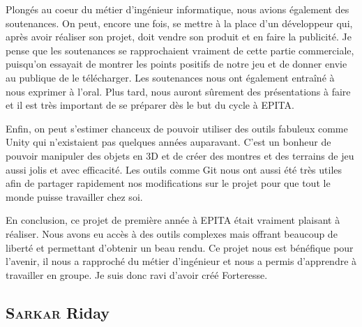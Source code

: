\documentclass[a4paper, 12pt]{article}
\begin{document}
\medbreak
\par Plongés au coeur du métier d’ingénieur informatique, nous avions également des soutenances. On peut, encore une fois, se mettre à la place d’un développeur qui, après avoir réaliser son projet, doit vendre son produit et en faire la publicité. Je pense que les soutenances se rapprochaient vraiment de cette partie commerciale, puisqu’on essayait de montrer les points positifs de notre jeu et de donner envie au publique de le télécharger. Les soutenances nous ont également entraîné à nous exprimer à l’oral. Plus tard, nous auront sûrement des présentations à faire et il est très important de se préparer dès le but du cycle à EPITA. 
\medbreak
\par Enfin, on peut s’estimer chanceux de pouvoir utiliser des outils fabuleux comme Unity qui n’existaient pas quelques années auparavant. C’est un bonheur de pouvoir manipuler des objets en 3D et de créer des montres et des terrains de jeu aussi jolis et avec efficacité. Les outils comme Git nous ont aussi été très utiles afin de partager rapidement nos modifications sur le projet pour que tout le monde puisse travailler chez soi.
\medbreak
\par En conclusion, ce projet de première année à EPITA était vraiment plaisant à réaliser. Nous avons eu accès à des outils complexes mais offrant beaucoup de liberté et permettant d’obtenir un beau rendu. Ce projet nous est bénéfique pour l’avenir, il nous a rapproché du métier d’ingénieur et nous a permis d’apprendre à travailler en groupe. Je suis donc ravi d’avoir créé Forteresse.

\subsection{\textsc{Sarkar} Riday}
\end{document}
